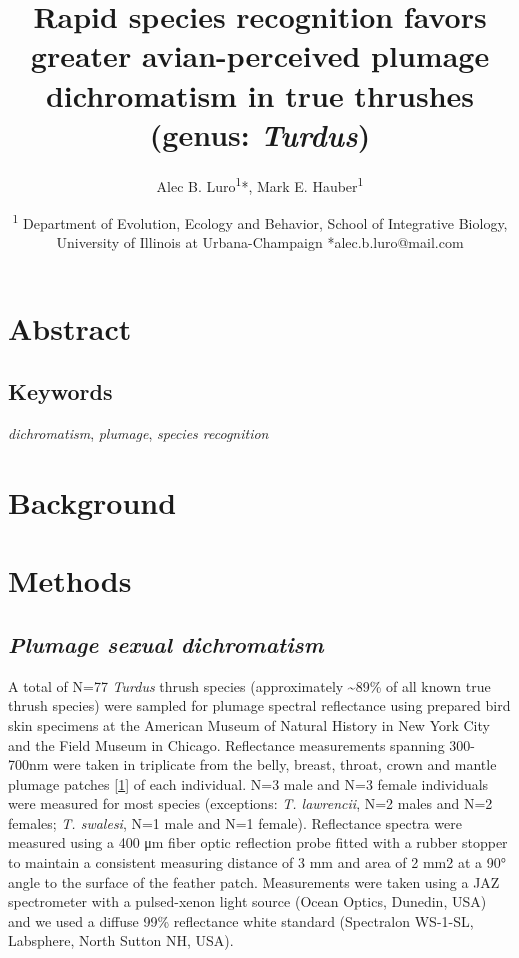 \documentclass[
  a4paper,
]{article}
\title{Rapid species recognition favors greater avian-perceived plumage
dichromatism in true thrushes (genus: \emph{Turdus})}
\author{Alec B. Luro\textsuperscript{1}*, Mark E.
Hauber\textsuperscript{1}}
\date{\textsuperscript{1} Department of Evolution, Ecology and Behavior,
School of Integrative Biology, University of Illinois at
Urbana-Champaign *alec.b.luro@mail.com}
\begin{document}
\maketitle

\hypertarget{abstract}{%
\section{Abstract}\label{abstract}}

\hypertarget{keywords}{%
\subsection{Keywords}\label{keywords}}

\emph{dichromatism}, \emph{plumage}, \emph{species recognition}

\hypertarget{background}{%
\section{Background}\label{background}}

\hypertarget{methods}{%
\section{Methods}\label{methods}}

\hypertarget{plumage-sexual-dichromatism}{%
\subsection{\texorpdfstring{\emph{Plumage sexual
dichromatism}}{Plumage sexual dichromatism}}\label{plumage-sexual-dichromatism}}

A total of N=77 \emph{Turdus} thrush species (approximately
\textasciitilde89\% of all known true thrush species) were sampled for
plumage spectral reflectance using prepared bird skin specimens at the
American Museum of Natural History in New York City and the Field Museum
in Chicago. Reflectance measurements spanning 300-700nm were taken in
triplicate from the belly, breast, throat, crown and mantle plumage
patches {[}\protect\hyperlink{ref-andersson2006}{1}{]} of each
individual. N=3 male and N=3 female individuals were measured for most
species (exceptions: \emph{T. lawrencii}, N=2 males and N=2 females;
\emph{T. swalesi}, N=1 male and N=1 female). Reflectance spectra were
measured using a 400 μm fiber optic reflection probe fitted with a
rubber stopper to maintain a consistent measuring distance of 3 mm and
area of 2 mm2 at a 90° angle to the surface of the feather patch.
Measurements were taken using a JAZ spectrometer with a pulsed-xenon
light source (Ocean Optics, Dunedin, USA) and we used a diffuse 99\%
reflectance white standard (Spectralon WS-1-SL, Labsphere, North Sutton
NH, USA).
\end{document}
